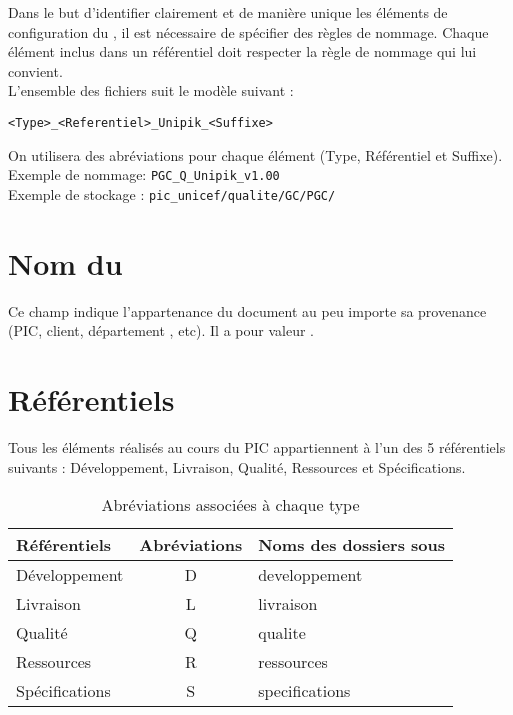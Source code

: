 
Dans le but d'identifier clairement et de manière unique les éléments de configuration du \picCourt{}, il est nécessaire de spécifier des règles de nommage. Chaque élément inclus dans un référentiel doit respecter la règle de nommage qui lui convient.\\

L'ensemble des fichiers suit le modèle suivant :
\begin{center}
  \verb+<Type>_<Referentiel>_Unipik_<Suffixe>+
\end{center}
On utilisera des abréviations pour chaque élément (Type, Référentiel et Suffixe).\\
Exemple de nommage: \verb+PGC_Q_Unipik_v1.00+\\
Exemple de stockage : \verb+pic_unicef/qualite/GC/PGC/+ 


\section{Nom du \picCourt{}}
Ce champ indique l'appartenance du document au \PICCourt{} peu importe sa provenance
 (PIC, client, département \ASI{}, etc). Il a pour valeur \textbf{\nomEquipe}.

\section{Référentiels}

Tous les éléments réalisés au cours du PIC appartiennent à l'un des 5 référentiels suivants : Développement, Livraison, Qualité, Ressources et Spécifications.
\begin{table}[H]
\centering
	\begin{tabularx}{11cm}{|X|c|X|}
	\hline
	\rowcolor[gray]{0.85} Référentiels & Abréviations & Noms des dossiers sous \git{} \\
	\hline
	Développement & D & developpement\\
	\hline
	Livraison & L & livraison\\
	\hline
	Qualité & Q & qualite\\
	\hline	
	Ressources & R & ressources\\
	\hline 
	Spécifications & S & specifications\\ 
	\hline
	\end{tabularx}
\caption{Abréviations associées à chaque type}
\label{Référentiel}
\end{table}


